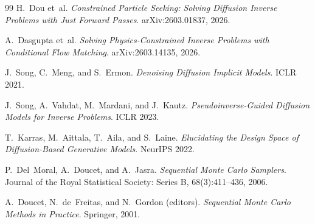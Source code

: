 \documentclass{article}
\begin{document}
\begin{thebibliography}{99}
H.~Dou et~al.
\emph{Constrained Particle Seeking: Solving Diffusion Inverse Problems
with Just Forward Passes}. arXiv:2603.01837, 2026.

A.~Dasgupta et~al.
\emph{Solving Physics-Constrained Inverse Problems with Conditional
Flow Matching}. arXiv:2603.14135, 2026.

J.~Song, C.~Meng, and S.~Ermon.
\emph{Denoising Diffusion Implicit Models}. ICLR 2021.

J.~Song, A.~Vahdat, M.~Mardani, and J.~Kautz.
\emph{Pseudoinverse-Guided Diffusion Models for Inverse Problems}.
ICLR 2023.

T.~Karras, M.~Aittala, T.~Aila, and S.~Laine.
\emph{Elucidating the Design Space of Diffusion-Based Generative
Models}. NeurIPS 2022.

P.~Del~Moral, A.~Doucet, and A.~Jasra.
\emph{Sequential Monte Carlo Samplers}.
Journal of the Royal Statistical Society: Series B, 68(3):411--436, 2006.

A.~Doucet, N.~de~Freitas, and N.~Gordon (editors).
\emph{Sequential Monte Carlo Methods in Practice}.
Springer, 2001.

\end{thebibliography}
\end{document}
